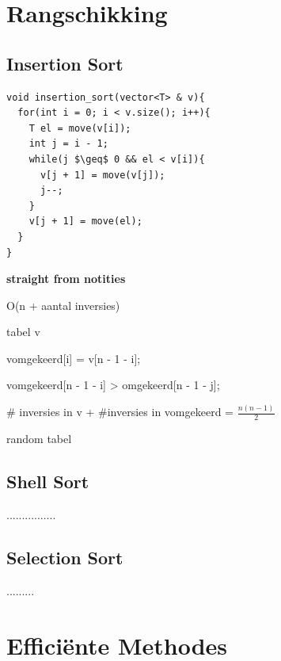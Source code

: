 \documentclass[12pt]{report}
\begin{document}
\chapter{Rangschikking}
\section{Insertion Sort}
\begin{lstlisting}
void insertion_sort(vector<T> & v){
  for(int i = 0; i < v.size(); i++){
    T el = move(v[i]);
    int j = i - 1;
    while(j $\geq$ 0 && el < v[i]){
      v[j + 1] = move(v[j]);
      j--;
    }
    v[j + 1] = move(el);
  }
}
\end{lstlisting}
\textbf{straight from notities}

O(n + aantal inversies)

tabel v

vomgekeerd[i] = v[n - 1 - i];

vomgekeerd[n - 1 - i] > omgekeerd[n - 1 - j];

\# inversies in v + \#inversies in vomgekeerd = $\frac{n(n - 1)}{2}$



random tabel

\section{Shell Sort}

................


\section{Selection Sort}
.........

\chapter{Efficiënte Methodes}
\end{document}
